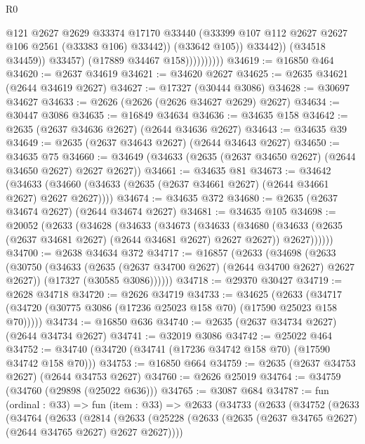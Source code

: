 \begin{lexlean}{R0}
\begin{coremodule}
                                  @121
                                  @2627
                                  @2629
                                  @33374
                                  @17170
                                  @33440
                                  (@33399 @107 @112 @2627 @2627 @106 @2561 (@33383 @106) @33442))
                                (@33642 @105))
                              @33442))
                          (@34518 @34459))
                        @33457)
                      (@17889 @34467 @158))))))))))
@34619 := @16850 @464
@34620 := @2637 @34619
@34621 := @34620 @2627
@34625 := @2635 @34621 (@2644 @34619 @2627)
@34627 := @17327 (@30444 @3086)
@34628 := @30697 @34627
@34633 := @2626 (@2626 (@2626 @34627 @2629) @2627)
@34634 := @30447 @3086
@34635 := @16849 @34634
@34636 := @34635 @158
@34642 := @2635 (@2637 @34636 @2627) (@2644 @34636 @2627)
@34643 := @34635 @39
@34649 := @2635 (@2637 @34643 @2627) (@2644 @34643 @2627)
@34650 := @34635 @75
@34660 := @34649 (@34633 (@2635 (@2637 @34650 @2627) (@2644 @34650 @2627) @2627 @2627))
@34661 := @34635 @81
@34673 := @34642
    (@34633 (@34660 (@34633 (@2635 (@2637 @34661 @2627) (@2644 @34661 @2627) @2627 @2627))))
@34674 := @34635 @372
@34680 := @2635 (@2637 @34674 @2627) (@2644 @34674 @2627)
@34681 := @34635 @105
@34698 := @20052
    (@2633
      (@34628
        (@34633
          (@34673
            (@34633
              (@34680
                (@34633 (@2635 (@2637 @34681 @2627) (@2644 @34681 @2627) @2627 @2627))
                @2627))))))
@34700 := @2638 @34634 @372
@34717 := @16857
    (@2633
      (@34698
        (@2633
          (@30750
            (@34633 (@2635 (@2637 @34700 @2627) (@2644 @34700 @2627) @2627 @2627))
            (@17327 (@30585 @3086))))))
@34718 := @29370 @30427
@34719 := @2628 @34718
@34720 := @2626 @34719
@34733 := @34625
    (@2633 (@34717 (@34720 (@30775 @3086 (@17236 @25023 @158 @70) (@17590 @25023 @158 @70)))))
@34734 := @16850 @636
@34740 := @2635 (@2637 @34734 @2627) (@2644 @34734 @2627)
@34741 := @32019 @3086
@34742 := @25022 @464
@34752 := @34740 (@34720 (@34741 (@17236 @34742 @158 @70) (@17590 @34742 @158 @70)))
@34753 := @16850 @664
@34759 := @2635 (@2637 @34753 @2627) (@2644 @34753 @2627)
@34760 := @2626 @25019
@34764 := @34759 (@34760 (@29898 (@25022 @636)))
@34765 := @3087 @684
@34787 := fun (ordinal : @33) =>
  fun (item : @33) =>
  @2633
    (@34733
      (@2633
        (@34752
          (@2633
            (@34764
              (@2633
                (@2814
                  (@2633
                    (@25228 (@2633 (@2635 (@2637 @34765 @2627) (@2644 @34765 @2627) @2627 @2627))))

\end{coremodule}
\end{lexlean}
